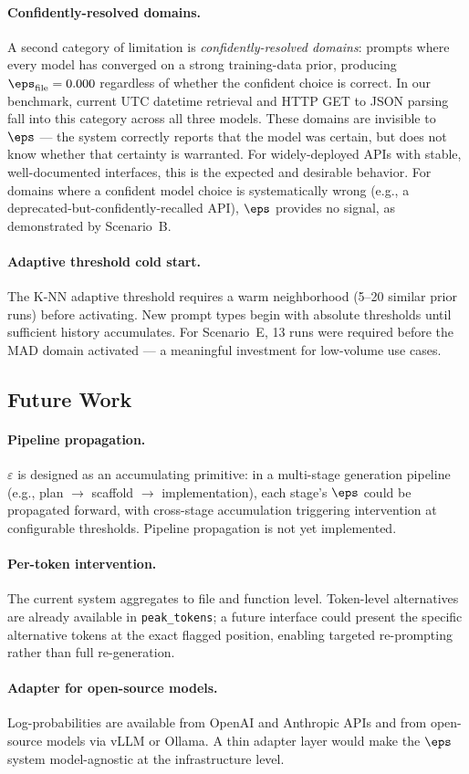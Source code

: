 \paragraph{Confidently-resolved domains.}
A second category of limitation is \emph{confidently-resolved domains}:
prompts where every model has converged on a strong training-data prior,
producing $\eps_\text{file} = 0.000$ regardless of whether the confident
choice is correct. In our benchmark, current UTC datetime retrieval and
HTTP GET to JSON parsing fall into this category across all three models.
These domains are invisible to $\eps$ --- the system correctly reports that
the model was certain, but does not know whether that certainty is warranted.
For widely-deployed APIs with stable, well-documented interfaces, this is the
expected and desirable behavior. For domains where a confident model choice
is systematically wrong (e.g., a deprecated-but-confidently-recalled API),
$\eps$ provides no signal, as demonstrated by Scenario~B.

\paragraph{Adaptive threshold cold start.}
The K-NN adaptive threshold requires a warm neighborhood (5--20 similar prior
runs) before activating. New prompt types begin with absolute thresholds until
sufficient history accumulates. For Scenario~E, 13 runs were required before
the MAD domain activated --- a meaningful investment for low-volume use cases.

\subsection{Future Work}

\paragraph{Pipeline propagation.}
$\varepsilon$ is designed as an accumulating primitive: in a multi-stage
generation pipeline (e.g., plan $\to$ scaffold $\to$ implementation), each
stage's $\eps$ could be propagated forward, with cross-stage accumulation
triggering intervention at configurable thresholds. Pipeline propagation is
not yet implemented.

\paragraph{Per-token intervention.}
The current system aggregates to file and function level. Token-level
alternatives are already available in \texttt{peak\_tokens}; a future interface
could present the specific alternative tokens at the exact flagged position,
enabling targeted re-prompting rather than full re-generation.

\paragraph{Adapter for open-source models.}
Log-probabilities are available from OpenAI and Anthropic APIs and from
open-source models via vLLM or Ollama. A thin adapter layer would make the
$\eps$ system model-agnostic at the infrastructure level.
